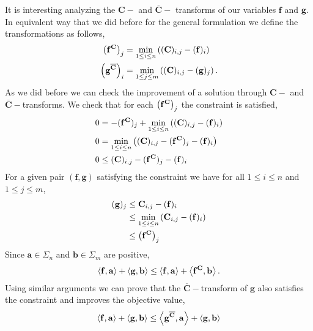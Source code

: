 It is interesting analyzing the $\mathbf{C}-$ and $\overline{\mathbf{C}}-$ transforms of our variables $\mathbf{f}$ and $\mathbf{g}$. In equivalent way that we did before for the general formulation we define the transformations as follows,
\begin{align}
	\left( \mathbf{f}^{\mathbf{C}} \right)_{j}&=\min_{1\leq i\leq n}\left( (\mathbf{C})_{i,j}-(\mathbf{f})_i \right)\\
	\left( \mathbf{g}^{\overline{\mathbf{C}}} \right)_{i}&=\min_{1\leq j\leq m}\left( (\mathbf{C})_{i,j}-(\mathbf{g})_j \right).
\end{align}
As we did before we can check the improvement of a solution through $\mathbf{C}-$ and $\overline{\mathbf{C}}-$transforms. We check that for each $\left( \mathbf{f}^{\mathbf{C}} \right)_{j}$ the constraint is satisfied,
\begin{align*}
	0&=-(\mathbf{f^{\mathbf{C}}})_j+\min_{1\leq i\leq n}\left( (\mathbf{C})_{i,j}-(\mathbf{f})_i \right)\\
	0&=\min_{1\leq i\leq n}\left( (\mathbf{C})_{i,j}-(\mathbf{f^{\mathbf{C}}})_j-(\mathbf{f})_i \right)\\
	0&\leq (\mathbf{C})_{i,j}-(\mathbf{f^{\mathbf{C}}})_j-(\mathbf{f})_i
\end{align*} 
For a given pair $(\mathbf{f,g})$ satisfying the constraint we have for all $1\leq i\leq n$ and $1\leq j\leq m$,
\begin{align*}
	(\mathbf{g})_j&\leq \mathbf{C}_{i,j}-(\mathbf{f})_i\\
	&\leq \min_{1\leq i\leq n}\left( \mathbf{C}_{i,j}-(\mathbf{f})_i \right) \\&\leq \left( \mathbf{f^\mathbf{C}} \right)_j
\end{align*} 
Since $\mathbf{a}\in \Sigma_n$ and $\mathbf{b}\in \Sigma_m$ are positive,
\begin{equation}
	\left\langle \mathbf{f},\mathbf{a} \right\rangle+\left\langle \mathbf{g},\mathbf{b} \right\rangle\leq \left\langle \mathbf{f},\mathbf{a} \right\rangle+\left\langle \mathbf{f^C},\mathbf{b} \right\rangle.
\end{equation}
Using similar arguments we can prove that the $\overline{\mathbf{C}}-$transform of $\mathbf{g}$ also satisfies the constraint and improves the objective value,
\begin{align}
	\left\langle \mathbf{f},\mathbf{a} \right\rangle+\left\langle \mathbf{g},\mathbf{b} \right\rangle\leq \left\langle \mathbf{g^{\overline{C}}},\mathbf{a} \right\rangle+\left\langle \mathbf{g},\mathbf{b} \right\rangle
\end{align}


